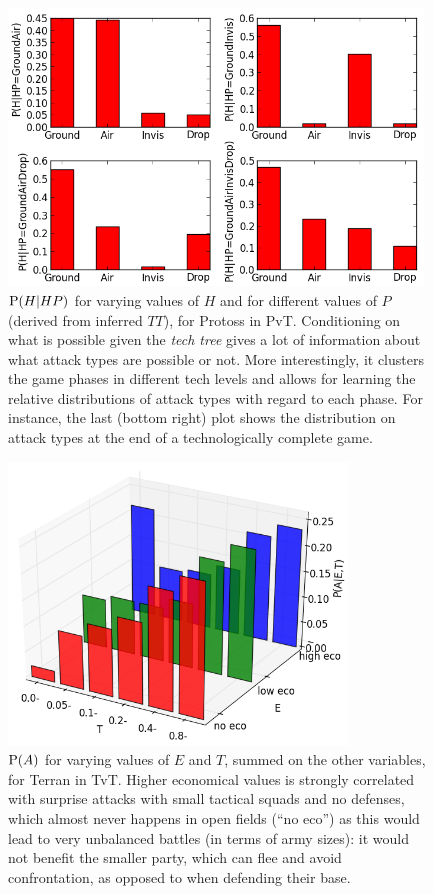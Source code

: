 \begin{figure}[!h]
\centerline{\includegraphics[width=11cm]{images/PossibleP.png}}
\caption{$\mathrm{P}(H|HP)$ for varying values of $H$ and for different values of $P$ (derived from inferred $TT$), for Protoss in PvT. Conditioning on what is possible given the \textit{tech tree} gives a lot of information about what attack types are possible or not. More interestingly, it clusters the game phases in different tech levels and allows for learning the relative distributions of attack types with regard to each phase. For instance, the last (bottom right) plot shows the distribution on attack types at the end of a technologically complete game.}
\label{fig:PossibleP}
\end{figure}

\begin{figure}[!h]
\centerline{\includegraphics[width=9cm]{images/where3D_EI_TI_RegT.png}}
\caption{$\mathrm{P}(A)$ for varying values of $E$ and $T$, summed on the other variables, for Terran in TvT. Higher economical values is strongly correlated with surprise attacks with small tactical squads and no defenses, which almost never happens in open fields (``no eco'') as this would lead to very unbalanced battles (in terms of army sizes): it would not benefit the smaller party, which can flee and avoid confrontation, as opposed to when defending their base.}
\label{fig:Where3D}
\end{figure}

